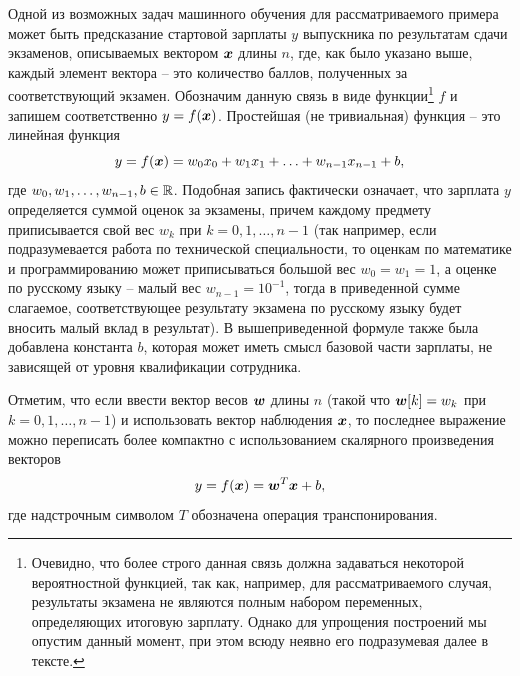 \documentclass[a4paper,12pt,russian]{article} %
\begin{document}
Одной из возможных задач машинного обучения для рассматриваемого примера может быть предсказание стартовой зарплаты $y$ выпускника по результатам сдачи экзаменов, описываемых вектором $\bm{x}$ длины $n$, где, как было указано выше, каждый элемент вектора -- это количество баллов, полученных за соответствующий экзамен.
Обозначим данную связь в виде функции\footnote{
	Очевидно, что более строго данная связь должна задаваться некоторой вероятностной функцией, так как, например, для рассматриваемого случая, результаты экзамена не являются полным набором переменных, определяющих итоговую зарплату.
	Однако для упрощения построений мы опустим данный момент, при этом всюду неявно его подразумевая далее в тексте.
}
$f$ и запишем соответственно $y = f(\bm{x})$.
Простейшая (не тривиальная) функция -- это линейная функция
$$
	y = f(\bm{x}) = w_0 x_0 + w_1 x_1 + \ldots + w_{n-1} x_{n-1} + b,
$$
где $ w_0, w_1, \ldots, w_{n-1}, b \in \mathbb{R}$.
Подобная запись фактически означает, что зарплата $y$ определяется суммой оценок за экзамены, причем каждому предмету приписывается свой вес $w_k$ при $k=0, 1, \ldots, n-1$ (так например, если подразумевается работа по технической специальности, то оценкам по математике и программированию может приписываться большой вес $w_0=w_1=1$, а оценке по русскому языку -- малый вес $w_{n-1}=10^{-1}$, тогда в приведенной сумме слагаемое, соответствующее результату экзамена по русскому языку будет вносить малый вклад в результат).
В вышеприведенной формуле также была добавлена константа $b$, которая может иметь смысл базовой части зарплаты, не зависящей от уровня квалификации сотрудника.

Отметим, что если ввести вектор весов $\bm{w}$ длины $n$ (такой что $\bm{w}[k] = w_k$  при $k=0, 1, \ldots, n-1$) и использовать  вектор наблюдения $\bm{x}$, то последнее выражение можно переписать более компактно с использованием скалярного произведения векторов
$$
	y = f(\bm{x}) = \bm{w}^T \bm{x} + b,
$$
где надстрочным символом $T$ обозначена операция транспонирования.
\end{document}
